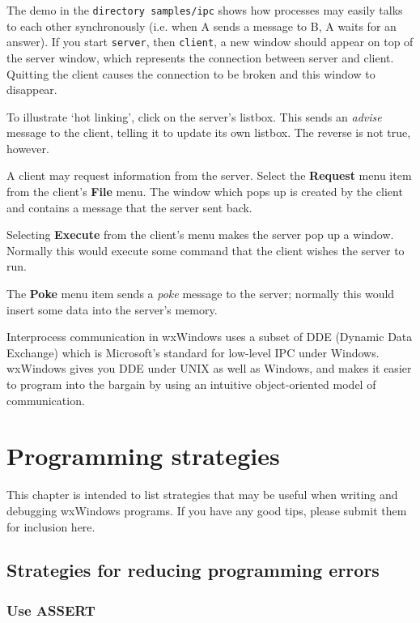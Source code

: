 The demo in the {\tt directory samples/ipc} shows how processes
may easily talks to each other synchronously (i.e. when A sends a message
to B, A waits for an answer). If you start {\tt server}, then {\tt client},
a new window should appear on top of the server window, which represents
the connection between server and client. Quitting the client causes
the connection to be broken and this window to disappear.

To illustrate `hot linking', click on the server's listbox. This sends
an {\it advise} message to the client, telling it to update its own
listbox. The reverse is not true, however.

A client may request information from the server. Select the {\bf Request}
menu item from the client's {\bf File} menu. The window which pops up
is created by the client and contains a message that the server sent back.

Selecting {\bf Execute} from the client's menu makes the server pop up a window.
Normally this would execute some command that the client wishes the server to run.

The {\bf Poke} menu item sends a {\it poke} message to the server; normally
this would insert some data into the server's memory.

Interprocess communication in wxWindows uses a subset of DDE (Dynamic Data Exchange)
which is Microsoft's standard for low-level IPC under Windows. wxWindows
gives you DDE under UNIX as well as Windows, and makes it easier to program
into the bargain by using an intuitive object-oriented model of communication.


\chapter{Programming strategies}\label{strategies}
%
\setfooter{\thepage}{}{}{}{}{\thepage}%

This chapter is intended to list strategies that may be useful when
writing and debugging wxWindows programs. If you have any good tips,
please submit them for inclusion here.

\section{Strategies for reducing programming errors}

\subsection{Use ASSERT}

